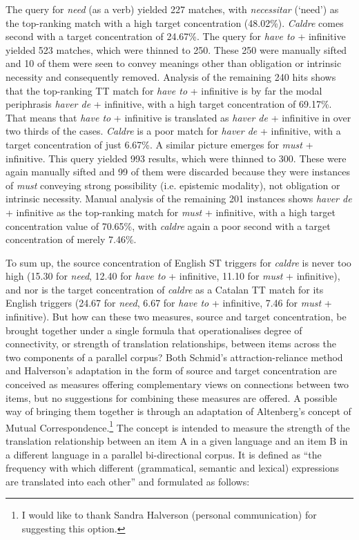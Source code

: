 \documentclass[output=paper,english,spanish,german,english]{langsci/langscibook}
\begin{document}
The query for \textit{need} (as a verb) yielded 227 matches, with \textit{necessitar} (`need') as the top-ranking match with a high target concentration (48.02\%). \textit{Caldre} comes second with a target concentration of 24.67\%. The query for \textit{have to} + infinitive yielded 523 matches, which were thinned to 250. These 250 were manually sifted and 10 of them were seen to convey meanings other than obligation or intrinsic necessity and consequently removed. Analysis of the remaining 240 hits shows that the top-ranking TT match for \textit{have to} + infinitive is by far the modal periphrasis \textit{haver de} + infinitive, with a high target concentration of 69.17\%. That means that \textit{have to} + infinitive is translated as \textit{haver de} + infinitive in over two thirds of the cases. \textit{Caldre} is a poor match for \textit{haver de} + infinitive, with a target concentration of just 6.67\%. A similar picture emerges for \textit{must} + infinitive. This query yielded 993 results, which were thinned to 300. These were again manually sifted and 99 of them were discarded because they were instances of \textit{must} conveying strong possibility (i.e. epistemic modality), not obligation or intrinsic necessity. Manual analysis of the remaining 201 instances shows \textit{haver de} + infinitive as the top-ranking match for \textit{must} + infinitive, with a high target concentration value of 70.65\%, with \textit{caldre} again a poor second with a target concentration of merely 7.46\%.

\largerpage
To sum up, the source concentration of English ST triggers for \textit{caldre} is never too high (15.30 for \textit{need}, 12.40 for \textit{have to} + infinitive, 11.10 for \textit{must} + infinitive), and nor is the target concentration of \textit{caldre} as a Catalan TT match for its English triggers (24.67 for \textit{need}, 6.67 for \textit{have to} + infinitive, 7.46 for \textit{must} + infinitive). But how can these two measures, source and target concentration, be brought together under a single formula that operationalises degree of connectivity, or strength of translation relationships, between items across the two components of a parallel corpus? Both Schmid’s attraction-reliance method and Halverson’s adaptation in the form of source and target concentration are conceived as measures offering complementary views on connections between two items, but no suggestions for combining these measures are offered. A possible way of bringing them together is through an adaptation of Altenberg’s \parencite*{altenberg99} concept of Mutual Correspondence.\footnote{I would like to thank Sandra Halverson (personal communication) for suggesting this option.} The concept is intended to measure the strength of the translation relationship between an item A in a given language and an item B in a different language in a parallel bi-directional corpus. It is defined as \enquote{the frequency with which different (grammatical, semantic and lexical) expressions are translated into each other} and formulated as follows:
\end{document}
